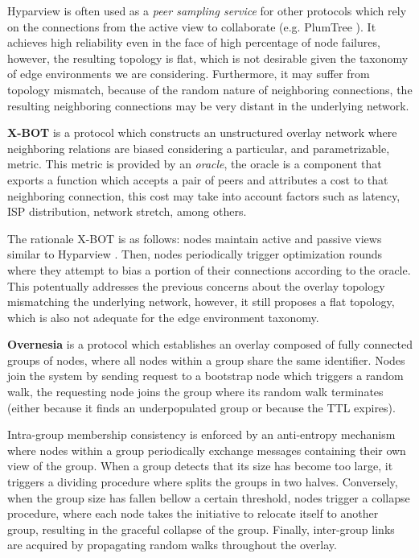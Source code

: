 Hyparview is often used as a \textit{peer sampling service} for other protocols which rely on the connections from the active view to collaborate (e.g. PlumTree \cite{leitao2007epidemic}). It achieves high reliability even in the face of high percentage of node failures, however, the resulting topology is flat, which is not desirable given the taxonomy of edge environments we are considering. Furthermore, it may suffer from topology mismatch, because of the random nature of neighboring connections, the resulting neighboring connections may be very distant in the underlying network.

\textbf{X-BOT} \cite{leitao2012x} is a protocol which constructs an unstructured overlay network where neighboring relations are biased  considering a particular, and parametrizable, metric. This metric is provided by an \textit{oracle}, the oracle is a component that exports a function which accepts a pair of peers and attributes a cost to that neighboring connection, this cost may take into account factors such as latency, ISP distribution, network stretch, among others. 

The rationale X-BOT is as follows: nodes maintain active and passive views similar to Hyparview \cite{Hyparview}. Then, nodes periodically trigger optimization rounds where they attempt to bias a portion of their connections according to the oracle. This potentually addresses the previous concerns about the overlay topology mismatching the underlying network, however, it still proposes a flat topology, which is also not adequate for the edge environment taxonomy. 

\textbf{Overnesia} \cite{leitao2014overnesia} is a protocol which establishes an overlay composed of fully connected groups of nodes, where all nodes within a group share the same identifier. Nodes join the system by sending request to a bootstrap node which triggers a random walk, the requesting node joins the group where its random walk terminates (either because it finds an underpopulated group or because the TTL expires). 

Intra-group membership consistency is enforced by an anti-entropy mechanism where nodes within a group periodically exchange messages containing their own view of the group. When a group detects that its size has become too large, it triggers a dividing procedure where splits the groups in two halves. Conversely, when the group size has fallen bellow a certain threshold, nodes trigger a collapse procedure, where each node takes the initiative to relocate itself to another group, resulting in the graceful collapse of the group. Finally, inter-group links are acquired by propagating random walks throughout the overlay.

